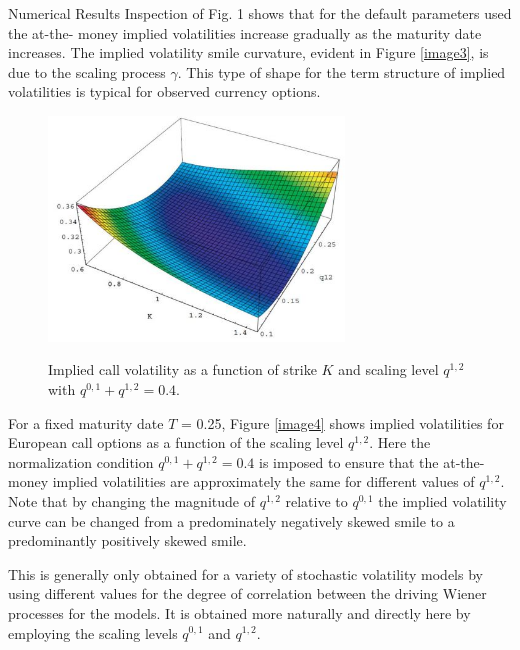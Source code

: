 \documentclass[unknownkeysallowed, compress]{beamer}
\theoremstyle{plain}
\begin{document}
\begin{frame}[allowframebreaks]{Numerical Results}
Inspection of Fig. 1 shows that for the default parameters used the at-the- money implied volatilities increase gradually as the maturity date
increases. The implied volatility smile curvature, evident in Figure \ref{image3}, is due to
the scaling process $\gamma$. This type of shape for the term structure of implied volatilities is  typical for observed currency options.
\begin{figure}[hp]
	\centering
		\includegraphics[width=0.70\textwidth]{fig2.JPG}
	\label{image2}
	\caption{Implied call volatility as a function of strike $K$ and scaling level $q^{1,2}$ with $q^{0,1}+q^{1,2} = 0.4.$}
\end{figure}
For a fixed maturity date $T$ = 0.25, Figure \ref{image4} shows implied volatilities for European call options as a function of the scaling level $q^{1,2}$. Here the normalization condition $q^{0,1}+q^{1,2} = 0.4$ is imposed to ensure that the at-the-money implied volatilities are approximately the same for different values of $q^{1,2}$. Note that by changing the magnitude of $q^{1,2}$ relative to $q^{0,1}$ the implied volatility curve can be changed from a predominately negatively skewed smile to a predominantly positively skewed smile.

This is generally only obtained for a variety of stochastic volatility models by using different values for the degree of correlation between the driving Wiener processes for the models. It is obtained more naturally and directly here by employing the %
scaling levels $q^{0,1}$ and $q^{1,2}$.


\end{frame}
\end{document}
